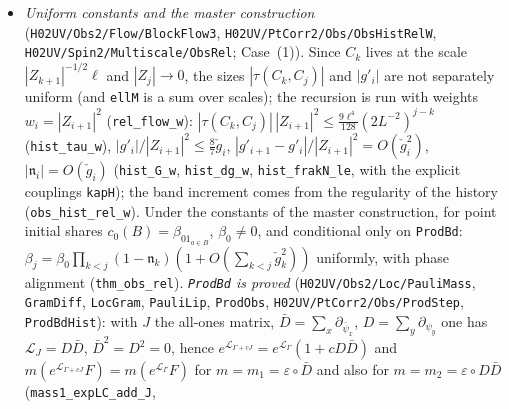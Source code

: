 \documentclass[11pt]{amsart}
\theoremstyle{definition}
\theoremstyle{remark}
\numberwithin{equation}{section}
\begin{document}
\begin{itemize}
  $\|\mathcal W^{\rm obs}_j\|\le c_Wr_jM_j$, the weighted $K^{\rm obs}_j$ bound is $\le16c_WBr_j^2s_j|\beta_j|$, and
  $|\beta_{j+1}-\beta_j(1-\mathfrak n_j)|\le c_\delta r_j^2|\beta_j(1-\mathfrak n_j)|$ (\texttt{RelRec.close},
  \texttt{MuChain.rel\_flow}); hence $|\beta_j-\beta_0\prod_{k<j}(1-\mathfrak n_k)|\le(e^{c_\delta\sum_{k<j}r_k^2}-1)
  |\beta_0\prod_{k<j}(1-\mathfrak n_k)|$ (\texttt{rel\_prod\_le}). Along the history (\texttt{obs\_hist\_rel}) the
  $\mathcal W$ and $K$ steps, the activity term in $\ell^1$ (\texttt{kobs\_EK1}), the tadpole decay, the field-scale ratio
  ($\rho\le\frac18$) and $\sum_kr_k^2\le c_R^2\varepsilon/\beta'$ (from $g_{k+1}\ge g_k+\beta'g_k^2$) are discharged; the
  remaining inputs are the bulk bounds on $g'_i$, $\mathfrak n_i$, the $\ell^1$ product bound (\texttt{ProdBd}), and
  $D_0=0$, $\beta_0\neq0$ for the initial state.
\item \emph{Uniform constants and the master construction} (\texttt{H02UV/Obs2/Flow/BlockFlow3}, \texttt{H02UV/PtCorr2/Obs/ObsHistRelW},
  \texttt{H02UV/Spin2/Multiscale/ObsRel}; Case~(1)). Since $C_k$ lives at the scale $|Z_{k+1}|^{-1/2}\ell$ and $|Z_j|\to0$, the sizes
  $|\tau(C_k,C_j)|$ and $|g'_i|$ are not separately uniform (and \texttt{ellM} is a sum over scales); the recursion is
  run with weights $w_i=|Z_{i+1}|^2$ (\texttt{rel\_flow\_w}): $|\tau(C_k,C_j)|\,|Z_{i+1}|^2\le\frac{9\ell^4}{128}(2L^{-2})^{j-k}$
  (\texttt{hist\_tau\_w}), $|g'_i|/|Z_{i+1}|^2\le\frac87\check g_i$, $|g'_{i+1}-g'_i|/|Z_{i+1}|^2=O(\check g_i^2)$,
  $|\mathfrak n_i|=O(\check g_i)$ (\texttt{hist\_G\_w}, \texttt{hist\_dg\_w}, \texttt{hist\_frakN\_le}, with the explicit couplings
  \texttt{kapH}); the band increment comes from the regularity of the history (\texttt{obs\_hist\_rel\_w}). Under the
  constants of the master construction, for point initial shares $c_0(B)=\beta_01_{a\in B}$, $\beta_0\ne0$, and conditional only on
  \texttt{ProdBd}: $\beta_j=\beta_0\prod_{k<j}(1-\mathfrak n_k)(1+O(\sum_{k<j}\check g_k^2))$ uniformly, with phase alignment
  (\texttt{thm\_obs\_rel}). \emph{\texttt{ProdBd} is proved} (\texttt{H02UV/Obs2/Loc/PauliMass}, \texttt{GramDiff}, \texttt{LocGram},
  \texttt{PauliLip}, \texttt{ProdObs}, \texttt{H02UV/PtCorr2/Obs/ProdStep}, \texttt{ProdBdHist}): with $J$ the all-ones matrix,
  $\bar D=\sum_x\partial_{\bar\psi_x}$, $D=\sum_y\partial_{\psi_y}$ one has $\mathcal L_J=D\bar D$, $\bar D^2=D^2=0$,
  hence $e^{\mathcal L_{\Gamma+cJ}}=e^{\mathcal L_\Gamma}(1+cD\bar D)$ and $m(e^{\mathcal L_{\Gamma+cJ}}F)=m(e^{\mathcal L_\Gamma}F)$
  for $m=m_1=\varepsilon\circ\bar D$ and also for $m=m_2=\varepsilon\circ D\bar D$ (\texttt{mass1\_expLC\_add\_J},

\end{itemize}
\end{document}

